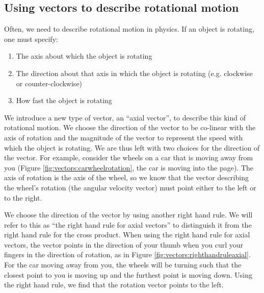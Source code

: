 \subsection{\label{subsec:Vectors:rotationalmotion}Using vectors to describe rotational motion}
Often, we need to describe rotational motion in physics. If an object is rotating, one must specify:
\begin{enumerate}
\item The axis about which the object is rotating
\item The direction about that axis in which the object is rotating (e.g. clockwise or counter-clockwise)
\item How fast the object is rotating
\end{enumerate}
We introduce a new type of vector, an ``axial vector'', to describe this kind of rotational motion. We choose the direction of the vector to be co-linear with the axis of rotation and the magnitude of the vector to represent the speed with which the object is rotating. We are thus left with two choices for the direction of the vector. For example, consider the wheels on a car that is moving away from you (Figure \ref{fig:vectors:carwheelrotation}, the car is moving into the page).  The axis of rotation is the axis of the wheel, so we know that the vector describing the wheel's rotation (the angular velocity vector) must point either to the left or to the right. 


We choose the direction of the vector by using another right hand rule. We will refer to this as ``the right hand rule for axial vectors'' to distinguish it from the right hand rule for the cross product.  When using the right hand rule for axial vectors, the vector points in the direction of your thumb when you curl your fingers in the direction of rotation, as in Figure \ref{fig:vectors:righthandruleaxial}. For the car moving away from you, the wheels will be turning such that the closest point to you is moving up and the furthest point is moving down. Using the right hand rule, we find that the rotation vector points to the left. 



